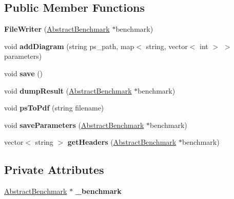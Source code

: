 \subsection*{Public Member Functions}
\begin{DoxyCompactItemize}
\item 
\hypertarget{classFileWriter_a15803cc3ab2d71ca13860979b6abe908}{{\bfseries File\-Writer} (\hyperlink{classAbstractBenchmark}{Abstract\-Benchmark} $\ast$benchmark)}\label{classFileWriter_a15803cc3ab2d71ca13860979b6abe908}

\item 
\hypertarget{classFileWriter_aec5359749aa8b2e3eea8da13de243993}{void {\bfseries add\-Diagram} (string ps\-\_\-path, map$<$ string, vector$<$ int $>$ $>$ parameters)}\label{classFileWriter_aec5359749aa8b2e3eea8da13de243993}

\item 
\hypertarget{classFileWriter_a52e3b4973201b3cea18b87679e2b08bb}{void {\bfseries save} ()}\label{classFileWriter_a52e3b4973201b3cea18b87679e2b08bb}

\item 
\hypertarget{classFileWriter_a028010d50bdd0448530cb30c80a63880}{void {\bfseries dump\-Result} (\hyperlink{classAbstractBenchmark}{Abstract\-Benchmark} $\ast$benchmark)}\label{classFileWriter_a028010d50bdd0448530cb30c80a63880}

\item 
\hypertarget{classFileWriter_ac1c2d9f75ff7bde36ee32fa4569d52f4}{void {\bfseries ps\-To\-Pdf} (string filename)}\label{classFileWriter_ac1c2d9f75ff7bde36ee32fa4569d52f4}

\item 
\hypertarget{classFileWriter_a806895d2d02267bf01cc547ec4f62f41}{void {\bfseries save\-Parameters} (\hyperlink{classAbstractBenchmark}{Abstract\-Benchmark} $\ast$benchmark)}\label{classFileWriter_a806895d2d02267bf01cc547ec4f62f41}

\item 
\hypertarget{classFileWriter_a3bdc99c8091b956d0eb4623fcd9206a3}{vector$<$ string $>$ {\bfseries get\-Headers} (\hyperlink{classAbstractBenchmark}{Abstract\-Benchmark} $\ast$benchmark)}\label{classFileWriter_a3bdc99c8091b956d0eb4623fcd9206a3}

\end{DoxyCompactItemize}
\subsection*{Private Attributes}
\begin{DoxyCompactItemize}
\item 
\hypertarget{classFileWriter_aec4dde08eafd3be33c3f386765f7826a}{\hyperlink{classAbstractBenchmark}{Abstract\-Benchmark} $\ast$ {\bfseries \-\_\-benchmark}}\label{classFileWriter_aec4dde08eafd3be33c3f386765f7826a}

\end{DoxyCompactItemize}


